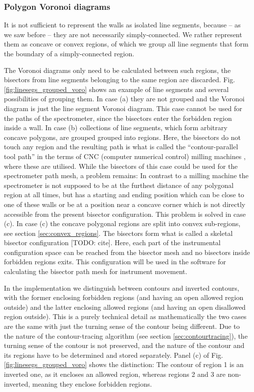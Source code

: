 \subsubsection*{Polygon Voronoi diagrams}
\label{sec:polygonal_voronoi_diagram}

It is not sufficient to represent the walls as isolated line segments, because -- 
as we saw before -- they are not necessarily simply-connected. 
We rather represent them as concave or convex regions, of which we group all 
line segments that form the boundary of a simply-connected region.

The Voronoi diagrams only need to be calculated between such regions, 
the bisectors from line segments belonging to the same region are discarded. 
Fig. \ref{fig:linesegs_grouped_voro} shows an example of line segments and several
possibilities of grouping them. 
In case (a) they are not grouped and the Voronoi diagram is just the line 
segment Voronoi diagram. This case cannot be used for the paths of the spectrometer,
since the bisectors enter the forbidden region inside a wall.
In case (b) collections of line segments, which form arbitrary concave polygons, 
are grouped grouped into regions. Here, the bisectors do not touch any region 
and the resulting path is what is called the ``contour-parallel tool path'' in 
the terms of CNC (computer numerical control) milling machines \cite{Jeong1998, wiki_milling}, 
where these are utilised. While the bisectors of this case could 
be used for the spectrometer path mesh, a problem remains: In contrast to a milling
machine the spectrometer is not supposed to be at the furthest distance of any
polygonal region at all times, but has a starting and ending position which can 
be close to one of these walls or be at a position near a concave corner which
is not directly accessible from the present bisector configuration. This problem
is solved in case (c).
In case (c) the concave polygonal regions are split into convex sub-regions, see
section \ref{sec:convex_regions}.
The bisectors form what is called a skeletal bisector configuration [TODO: cite].
Here, each part of the instrumental configuration space can be reached from the
bisector mesh and no bisectors inside forbidden regions exits. This configuration
will be used in the software for calculating the bisector path mesh for instrument
movement.

In the implementation we distinguish between contours and inverted contours, with 
the former enclosing forbidden regions (and having an open allowed region outside) 
and the latter enclosing allowed regions (and having an open disallowed region outside).
This is a purely technical detail as mathematically the two cases are the same
with just the turning sense of the contour being different. 
Due to the nature of the contour-tracing algorithm (see section \ref{sec:contourtracing}), 
the turning sense of the contour is not preserved, and the nature of the contour 
and its regions have to be determined and stored separately.
Panel (c) of Fig. \ref{fig:linesegs_grouped_voro} shows the distinction: 
The contour of region 1 is an inverted one, as it encloses an allowed region,
whereas regions 2 and 3 are non-inverted, meaning they enclose forbidden regions.

